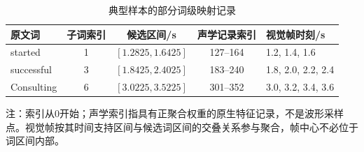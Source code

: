 \begin{table}[H]
    \centering
    \caption{典型样本的部分词级映射记录}
    \label{tab:p1_mapping_records}
    \begingroup
    \small
    \setlength{\tabcolsep}{3pt}
    \renewcommand{\arraystretch}{1.2}
    \begin{lrbox}{\pOneResultTableBox}
\begin{tabular}{@{}l c c c l@{}}
        \hline
        原文词 & 子词索引 & 候选区间/s & 声学记录索引 & 视觉帧时刻/s\\ \hline
        started & 1 & $[1.2825,1.6425]$ & 127--164 & 1.2, 1.4, 1.6\\
        successful & 3 & $[1.8425,2.4025]$ & 183--240 & 1.8, 2.0, 2.2, 2.4\\
        Consulting & 6 & $[3.0225,3.5225]$ & 301--352 & 3.0, 3.2, 3.4, 3.6\\
        \hline
    \end{tabular}
\end{lrbox}
\usebox{\pOneResultTableBox}
    \par\smallskip
    \parbox{\wd\pOneResultTableBox}{\footnotesize 注：索引从0开始；声学索引指具有正聚合权重的原生特征记录，不是波形采样点。视觉帧按其时间支持区间与候选词区间的交叠关系参与聚合，帧中心不必位于词区间内部。}
    \endgroup
\end{table}
